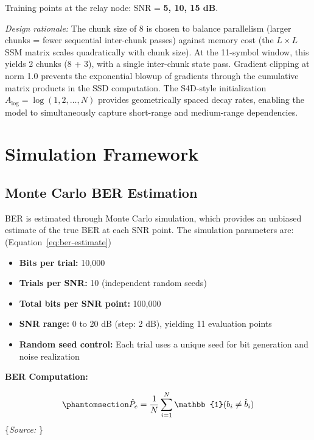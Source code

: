 \documentclass[
  english,
  12pt,
  12pt,
  a4paper,
  oneside]{report}
\providecommand{\tightlist}{%
  \setlength{\itemsep}{0pt}\setlength{\parskip}{0pt}}
\begin{document}
\begin{itemize}
  Training points at the relay node: SNR = \textbf{5, 10, 15 dB}.

  \emph{Design rationale:} The chunk size of 8 is chosen to balance parallelism (larger chunks = fewer sequential inter-chunk passes) against memory cost (the \(L \times L\) SSM matrix scales quadratically with chunk size). At the 11-symbol window, this yields 2 chunks (8 + 3), with a single inter-chunk state pass. Gradient clipping at norm 1.0 prevents the exponential blowup of gradients through the cumulative matrix products in the SSD computation. The S4D-style initialization \(A_{\text{log}} = \log(1, 2, \dots, N)\) provides geometrically spaced decay rates, enabling the model to simultaneously capture short-range and medium-range dependencies.
\end{itemize}

\section{Simulation Framework}\label{sec:simulation-framework}

\subsection{Monte Carlo BER Estimation}\label{sec:monte-carlo-ber-estimation}

BER is estimated through Monte Carlo simulation, which provides an unbiased estimate of the true BER at each SNR point. The simulation parameters are: (Equation~\ref{eq:ber-estimate})

\begin{itemize}
\tightlist
\item
  \textbf{Bits per trial:} 10,000
\item
  \textbf{Trials per SNR:} 10 (independent random seeds)
\item
  \textbf{Total bits per SNR point:} 100,000
\item
  \textbf{SNR range:} 0 to 20 dB (step: 2 dB), yielding 11 evaluation points
\item
  \textbf{Random seed control:} Each trial uses a unique seed for bit generation and noise realization
\end{itemize}

\textbf{BER Computation:}

\begin{equation}\protect\phantomsection\label{eq:ber-estimate}{\hat{P}_e = \frac{1}{N}\sum_{i=1}^{N} \mathbb{1}(b_i \neq \hat{b}_i)
}\end{equation} \footnotesize\{\textit{Source: \1}\}\normalsize
\end{document}
